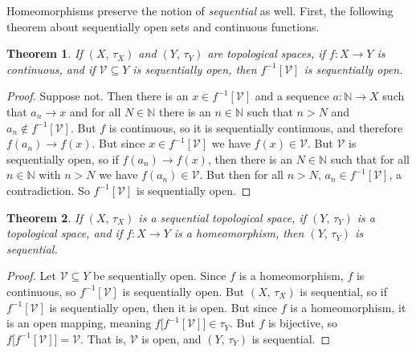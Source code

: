 \documentclass{article}
\theoremstyle{plain}
\newtheorem{theorem}{Theorem}[section]
\theoremstyle{normal}
\begin{document}
        Homeomorphisms preserve the notion of \textit{sequential} as well.
        First, the following theorem about sequentially open sets and continuous
        functions.
        \begin{theorem}
            If $(X,\,\tau_{X})$ and $(Y,\,\tau_{Y})$ are topological spaces,
            if $f:X\rightarrow{Y}$ is continuous, and if
            $\mathcal{V}\subseteq{Y}$ is sequentially open, then
            $f^{-1}[\mathcal{V}]$ is sequentially open.
        \end{theorem}
        \begin{proof}
            Suppose not. Then there is an $x\in{f}^{-1}[\mathcal{V}]$ and a
            sequence $a:\mathbb{N}\rightarrow{X}$ such that
            $a_{n}\rightarrow{x}$ and for all $N\in\mathbb{N}$ there is an
            $n\in\mathbb{N}$ such that $n>N$ and
            $a_{n}\notin{f}^{-1}[\mathcal{V}]$. But $f$ is continuous, so it
            is sequentially continuous, and therefore
            $f(a_{n})\rightarrow{f}(x)$. But since $x\in{f}^{-1}[\mathcal{V}]$
            we have $f(x)\in\mathcal{V}$. But $\mathcal{V}$ is sequentially
            open, so if $f(a_{n})\rightarrow{f}(x)$, then there is an
            $N\in\mathbb{N}$ such that for all $n\in\mathbb{N}$ with $n>N$
            we have $f(a_{n})\in\mathcal{V}$. But then for all $n>N$,
            $a_{n}\in{f}^{-1}[\mathcal{V}]$, a contradiction. So
            $f^{-1}[\mathcal{V}]$ is sequentially open.
        \end{proof}
        \begin{theorem}
            If $(X,\,\tau_{X})$ is a sequential topological space, if
            $(Y,\,\tau_{Y})$ is a topological space, and if $f:X\rightarrow{Y}$
            is a homeomorphism, then $(Y,\,\tau_{Y})$ is sequential.
        \end{theorem}
        \begin{proof}
            Let $\mathcal{V}\subseteq{Y}$ be sequentially open. Since $f$ is
            a homeomorphism, $f$ is continuous, so $f^{-1}[\mathcal{V}]$
            is sequentially open. But $(X,\,\tau_{X})$ is sequential, so
            if $f^{-1}[\mathcal{V}]$ is sequentially open, then it is open.
            But since $f$ is a homeomorphism, it is an open mapping, meaning
            $f\big[f^{-1}[\mathcal{V}]\big]\in\tau_{Y}$. But
            $f$ is bijective, so $f\big[f^{-1}[\mathcal{V}]\big]=\mathcal{V}$.
            That is, $\mathcal{V}$ is open, and $(Y,\,\tau_{Y})$ is
            sequential.
        \end{proof}
\end{document}
